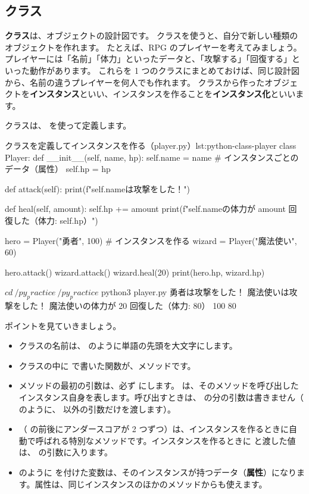\subsection{クラス}

\textbf{クラス}は、オブジェクトの設計図です。
クラスを使うと、自分で新しい種類のオブジェクトを作れます。
たとえば、RPG のプレイヤーを考えてみましょう。
プレイヤーには「名前」「体力」といったデータと、「攻撃する」「回復する」といった動作があります。
これらを 1 つのクラスにまとめておけば、同じ設計図から、名前の違うプレイヤーを何人でも作れます。
クラスから作ったオブジェクトを\textbf{インスタンス}といい、インスタンスを作ることを\textbf{インスタンス化}といいます。

クラスは、 を使って定義します。

\begin{codelisting}[style=python]{クラスを定義してインスタンスを作る（player.py）}{lst:python-class-player}
class Player:
    def __init__(self, name, hp):
        self.name = name   # インスタンスごとのデータ（属性）
        self.hp = hp

    def attack(self):
        print(f"{self.name}は攻撃をした！")

    def heal(self, amount):
        self.hp += amount
        print(f"{self.name}の体力が {amount} 回復した（体力: {self.hp}）")


hero = Player("勇者", 100)      # インスタンスを作る
wizard = Player("魔法使い", 60)

hero.attack()
wizard.attack()
wizard.heal(20)
print(hero.hp, wizard.hp)
\end{codelisting}

\begin{terminal}[クラスのプログラムを実行する]
$ cd ~/py_practice
~/py_practice$ python3 player.py
勇者は攻撃をした！
魔法使いは攻撃をした！
魔法使いの体力が 20 回復した（体力: 80）
100 80
\end{terminal}

ポイントを見ていきましょう。

\begin{itemize}
  \item クラスの名前は、 のように単語の先頭を大文字にします。
  \item クラスの中に  で書いた関数が、メソッドです。
  \item メソッドの最初の引数は、必ず  にします。 は、そのメソッドを呼び出したインスタンス自身を表します。呼び出すときは、 の分の引数は書きません（ のように、 以外の引数だけを渡します）。
  \item {}（ の前後にアンダースコアが 2 つずつ）は、インスタンスを作るときに自動で呼ばれる特別なメソッドです。インスタンスを作るときに  と渡した値は、 の引数に入ります。
  \item {} のように  を付けた変数は、そのインスタンスが持つデータ（\textbf{属性}）になります。属性は、同じインスタンスのほかのメソッドからも使えます。
\end{itemize}


